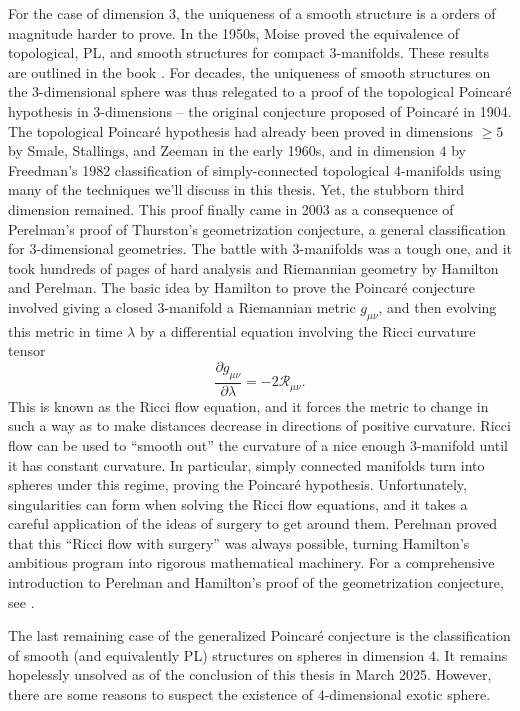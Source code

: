 For the case of dimension $3$, the uniqueness of a smooth structure is a orders of magnitude harder to prove. In the 1950s, Moise proved the equivalence of topological, PL, and smooth structures for compact $3$-manifolds. These results are outlined in the book \cite{moise1977geometric}. For decades, the uniqueness of smooth structures on the 3-dimensional sphere was thus relegated to a proof of the topological Poincar\'e hypothesis in 3-dimensions -- the original conjecture proposed of Poincar\'e in 1904. The topological Poincar\'e hypothesis had already been proved in dimensions $\geq 5$ by Smale, Stallings, and Zeeman in the early 1960s, and in dimension $4$ by Freedman's 1982 classification \cite{freedman1982manifold} of simply-connected topological $4$-manifolds using many of the techniques we'll discuss in this thesis. Yet, the stubborn third dimension remained.
This proof finally came in 2003 as a consequence of Perelman's proof of Thurston's geometrization conjecture, a general classification for 3-dimensional geometries.
The battle with $3$-manifolds was a tough one, and it took hundreds of pages of hard analysis and Riemannian geometry by Hamilton and Perelman.
The basic idea by Hamilton to prove the Poincar\'e conjecture involved giving a
closed $3$-manifold a Riemannian metric $g_{\mu\nu}$, and then evolving this metric in time $\lambda$ by a differential equation involving the Ricci curvature tensor
\begin{equation}
	\frac{\partial g_{\mu\nu}}{\partial \lambda} = -2\mathcal{R}_{\mu\nu}.
\end{equation}
This is known as the Ricci flow equation, and it forces the metric to change in such a way as to make distances decrease in directions of positive curvature.
Ricci flow can be used to ``smooth out'' the curvature of a nice enough $3$-manifold until it has constant curvature. In particular, simply connected manifolds turn into spheres under this regime, proving the Poincar\'e hypothesis.
Unfortunately, singularities can form when solving the Ricci flow equations, and it takes a careful application of the ideas of surgery to get around them. Perelman proved that this ``Ricci flow with surgery'' was always possible, turning Hamilton's ambitious program into rigorous mathematical machinery. For a comprehensive introduction to Perelman and Hamilton's proof of the geometrization conjecture, see \cite{morgantian2007ricci}.

The last remaining case of the generalized Poincar\'e conjecture is the classification of smooth (and equivalently PL) structures on spheres in dimension $4$. It remains hopelessly unsolved as of the conclusion of this thesis in March 2025. However, there are some reasons to suspect the existence of $4$-dimensional exotic sphere.


